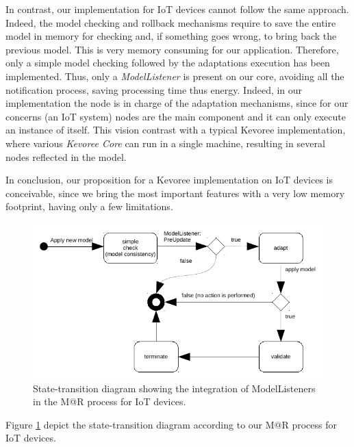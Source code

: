 In contrast, our implementation for IoT devices cannot follow the same approach.
Indeed, the model checking and rollback mechanisms require to save the entire model in memory for checking and, if something goes wrong, to bring back the previous model.
This is very memory consuming for our application.
Therefore, only a simple model checking followed by the adaptations execution has been implemented.
Thus, only a \textit{ModelListener} is present on our core, avoiding all the notification process, saving processing time thus energy.
Indeed, in our implementation the node is in charge of the adaptation mechanisms, since for our concerns (an IoT system) nodes are the main component and it can only execute an instance of itself.
This vision contrast with a typical Kevoree implementation, where various \textit{Kevoree Core} can run in a single machine, resulting in several nodes reflected in the model.

In conclusion, our proposition for a Kevoree implementation on IoT devices is conceivable, since we bring the most important features with a very low memory footprint, having only a few limitations.


\begin{figure}[]
	\centering
	\includegraphics[width=0.85\columnwidth]{chapters/modelsAtRuntimeContiki.images/modelListenerIoT.pdf}
	\caption{State-transition diagram showing the integration of ModelListeners in the M@R process for IoT devices.}
	\label{fig:MAR_modelListenerIoT}
\end{figure}

Figure \ref{fig:MAR_modelListenerIoT} depict the state-transition diagram according to our M@R process for IoT devices.

